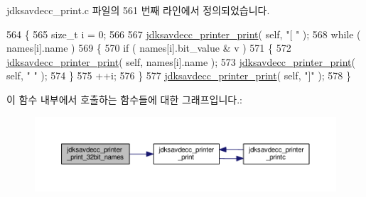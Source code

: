 jdksavdecc\+\_\+print.\+c 파일의 561 번째 라인에서 정의되었습니다.


\begin{DoxyCode}
564 \{
565     \textcolor{keywordtype}{size\_t} i = 0;
566 
567     \hyperlink{group__util_ga335ac75e0aa3fe66501b752bf9d0f90d}{jdksavdecc\_printer\_print}( \textcolor{keyword}{self}, \textcolor{stringliteral}{"[ "} );
568     \textcolor{keywordflow}{while} ( names[i].name )
569     \{
570         \textcolor{keywordflow}{if} ( names[i].bit\_value & v )
571         \{
572             \hyperlink{group__util_ga335ac75e0aa3fe66501b752bf9d0f90d}{jdksavdecc\_printer\_print}( \textcolor{keyword}{self}, names[i].name );
573             \hyperlink{group__util_ga335ac75e0aa3fe66501b752bf9d0f90d}{jdksavdecc\_printer\_print}( \textcolor{keyword}{self}, \textcolor{stringliteral}{" "} );
574         \}
575         ++i;
576     \}
577     \hyperlink{group__util_ga335ac75e0aa3fe66501b752bf9d0f90d}{jdksavdecc\_printer\_print}( \textcolor{keyword}{self}, \textcolor{stringliteral}{"]"} );
578 \}
\end{DoxyCode}


이 함수 내부에서 호출하는 함수들에 대한 그래프입니다.\+:
\nopagebreak
\begin{figure}[H]
\begin{center}
\leavevmode
\includegraphics[width=350pt]{group__util_ga12c5206fd238e3e8188693746f0d8ce7_cgraph}
\end{center}
\end{figure}





